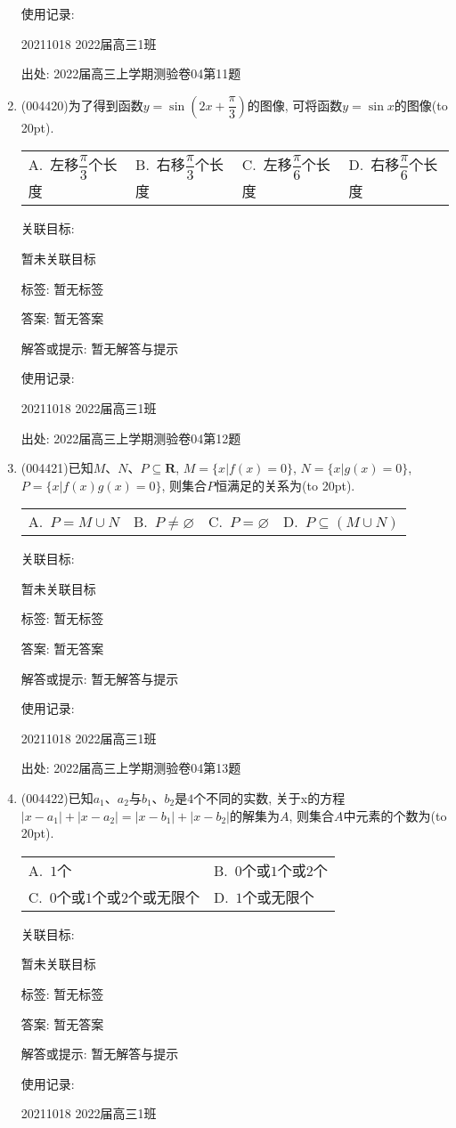 \documentclass[10pt,a4paper]{article}
\newcommand{\bracket}[1]{(\hbox to #1pt{})}
\newcommand{\twoch}[4]{\par\begin{tabular}{p{.46\textwidth}p{.46\textwidth}}
A.~#1& B.~#2\\
C.~#3& D.~#4
\end{tabular}}
\newcommand{\fourch}[4]{\par\begin{tabular}{p{.23\textwidth}p{.23\textwidth}p{.23\textwidth}p{.23\textwidth}}
A.~#1 &B.~#2& C.~#3& D.~#4
\end{tabular}}
\begin{document}
\begin{enumerate}[1.]
使用记录:

20211018	2022届高三1班	


出处: 2022届高三上学期测验卷04第11题
\item { (004420)}为了得到函数$y=\sin (2x+\dfrac{\pi}3)$的图像, 可将函数$y=\sin x$的图像\bracket{20}.
\fourch{左移$\dfrac{\pi}3$个长度}{右移$\dfrac{\pi}3$个长度}{左移$\dfrac{\pi}6$个长度}{右移$\dfrac{\pi}6$个长度}


关联目标:

暂未关联目标



标签: 暂无标签

答案: 暂无答案

解答或提示: 暂无解答与提示

使用记录:

20211018	2022届高三1班	


出处: 2022届高三上学期测验卷04第12题
\item { (004421)}已知$M$、$N$、$P\subseteq \mathbf{R}$, $M=\{x|f(x)=0\}$, $N=\{x|g(x)=0\}$, $P=\{x|f(x)g(x)=0\}$, 则集合$P$恒满足的关系为\bracket{20}.
\fourch{$P=M\cup N$}{$P\ne \varnothing$}{$P=\varnothing$}{$P\subseteq (M\cup N)$}


关联目标:

暂未关联目标



标签: 暂无标签

答案: 暂无答案

解答或提示: 暂无解答与提示

使用记录:

20211018	2022届高三1班	


出处: 2022届高三上学期测验卷04第13题
\item { (004422)}已知$a_1$、$a_2$与$b_1$、$b_2$是$4$个不同的实数, 关于x的方程$|x-a_1|+|x-a_2|=|x-b_1|+|x-b_2|$的解集为$A$, 则集合$A$中元素的个数为\bracket{20}.
\twoch{$1$个}{$0$个或$1$个或$2$个}{$0$个或$1$个或$2$个或无限个}{$1$个或无限个}


关联目标:

暂未关联目标



标签: 暂无标签

答案: 暂无答案

解答或提示: 暂无解答与提示

使用记录:

20211018	2022届高三1班	



\end{enumerate}
\end{document}
